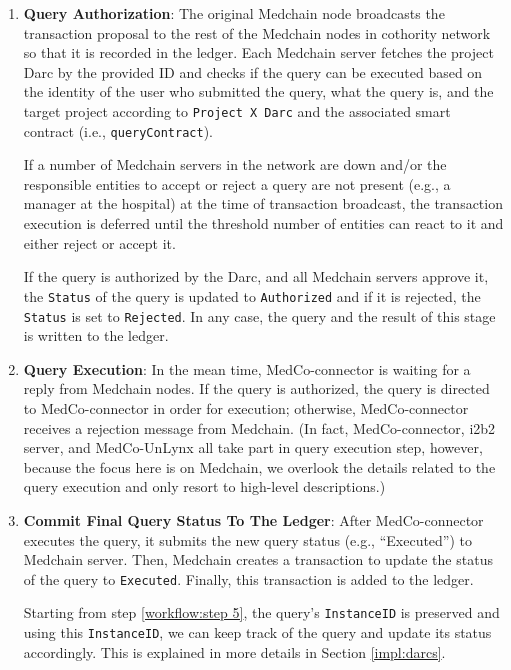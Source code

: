 \begin{enumerate}
    \item \textbf{Query Authorization}: The original Medchain node broadcasts the transaction proposal to the rest of the Medchain nodes in cothority network so that it is recorded in the ledger. Each Medchain server fetches the project Darc by the provided ID and checks if the query can be executed based on the identity of the user who submitted the query, what the query is, and the target project according to \texttt{Project X Darc} and the associated smart contract (i.e., \texttt{queryContract}).
    
    If a number of Medchain servers in the network are down and/or the responsible entities to accept or reject a query are not present (e.g., a manager at the hospital) at the time of transaction broadcast, the transaction execution is deferred until the threshold number of entities can react to it and either reject or accept it.  
    
    If the query is authorized by the Darc, and all Medchain servers approve it, the \texttt{Status} of the query is updated to \texttt{Authorized} and if it is rejected, the \texttt{Status} is set to \texttt{Rejected}. In any case, the query and the result of this stage is written to the ledger. 
    
    \item \textbf{Query Execution}: In the mean time, MedCo-connector is waiting for a reply from Medchain nodes. If the query is authorized, the query is directed to MedCo-connector in order for execution; otherwise, MedCo-connector receives a rejection message from Medchain. (In fact, MedCo-connector, i2b2 server, and MedCo-UnLynx all take part in query execution step, however, because the focus here is on Medchain, we overlook the details related to the query execution and only resort to high-level descriptions.) 
    
    \item \textbf{Commit Final Query Status To The Ledger}: After MedCo-connector executes the query, it submits the new query status (e.g., “Executed”) to Medchain server. Then, Medchain creates a transaction to update the status of the query to \texttt{Executed}. Finally, this transaction is added to the ledger. 

Starting from step \ref{workflow:step 5}, the query's \texttt{InstanceID} is preserved and using this \texttt{InstanceID}, we can keep track of the query and update its status accordingly. This is explained in more details in Section \ref{impl:darcs}.
    
\end{enumerate}
 
